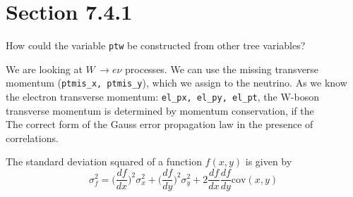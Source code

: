 \documentclass{article}
\begin{document}
\section{Section 7.4.1}
How could the variable \texttt{ptw} be constructed from other tree variables?\\
\par We are looking at $W \, \rightarrow e \nu$ processes. We can use the missing transverse momentum (\texttt{ptmis\_x, ptmis\_y}), which we assign to the neutrino. As we know the electron transverse momentum: \texttt{el\_px, el\_py, el\_pt}, the W-boson transverse momentum is determined by momentum conservation, if the \\[14pt]
The correct form of the Gauss error propagation law in the presence of correlations.\\
\par The standard deviation squared of a function $f(x,y)$ is given by
\begin{equation}
\sigma_f^2 = \Big(\frac{df}{dx}\Big)^2 \sigma_x^2 + \Big( \frac{df}{dy} \Big)^2 \sigma_y^2 + 2 \frac{df}{dx}\frac{df}{dy}\text{cov}(x,y)
\end{equation}
\end{document}

